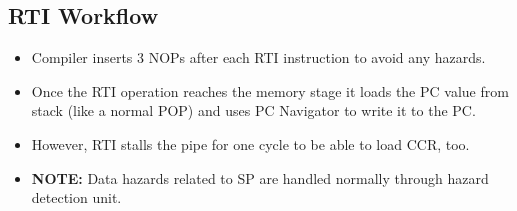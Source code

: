 \subsection{RTI Workflow}
\begin{itemize}
    \item Compiler inserts 3 NOPs after each RTI instruction to avoid any hazards.
    \item  Once the RTI operation reaches the memory stage it loads the PC value from stack (like a normal POP) and uses PC Navigator to write it to the PC.
    \item However, RTI stalls the pipe for one cycle to be able to load CCR, too.
    \item \textbf{NOTE:} Data hazards related to SP are handled normally through hazard detection unit.
\end{itemize}